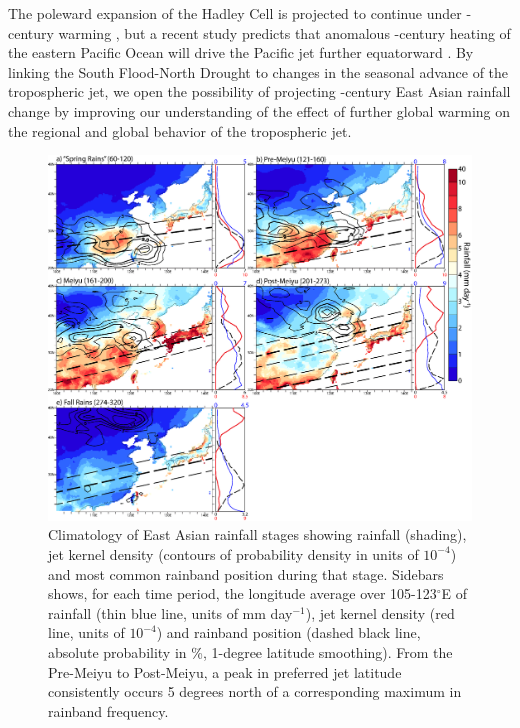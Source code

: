 	The poleward expansion of the Hadley Cell is projected to continue under -century warming \citep{Frierson2007,Lu2007,Kang2012}, but a recent study predicts that anomalous -century heating of the eastern Pacific Ocean will drive the Pacific jet further equatorward \citep{Park2014}. By linking the South Flood-North Drought to changes in the seasonal advance of the tropospheric jet, we open the possibility of projecting -century East Asian rainfall change by improving our understanding of the effect of further global warming on the regional and global behavior of the tropospheric jet.


\begin{figure}
\centering
\noindent\includegraphics[width=36pc]{Figures/ch4/climo}
\caption{Climatology of East Asian rainfall stages showing rainfall (shading), jet kernel density (contours of probability density in units of $10^{-4}$) and most common rainband position during that stage. Sidebars shows, for each time period, the longitude average over 105-123$^{\circ}$E of rainfall (thin blue line, units of mm day$^{-1}$), jet kernel density (red line, units of $10^{-4}$) and rainband position (dashed black line, absolute probability in \%, 1-degree latitude smoothing). From the Pre-Meiyu to Post-Meiyu, a peak in preferred jet latitude consistently occurs 5 degrees north of a corresponding maximum in rainband frequency.}
\label{fig:climo}
\end{figure}


